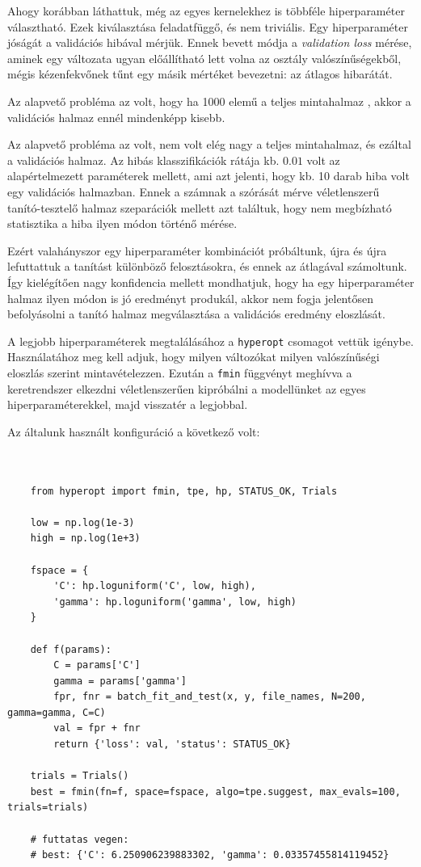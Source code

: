 Ahogy korábban láthattuk, még az egyes kernelekhez is többféle hiperparaméter választható. Ezek kiválasztása
feladatfüggő, és nem triviális. Egy hiperparaméter jóságát a validációs hibával mérjük. Ennek 
bevett módja a \textit{validation loss} mérése, aminek egy változata ugyan előállítható lett volna 
az osztály valószínűségekből, mégis kézenfekvőnek tűnt egy másik mértéket bevezetni: az átlagos hibarátát.

Az alapvető probléma az volt, hogy ha 1000 elemű a teljes mintahalmaz , akkor a validációs 
halmaz ennél mindenképp kisebb. 

Az alapvető probléma az volt, nem volt elég nagy a teljes mintahalmaz, és ezáltal a validációs halmaz.
Az hibás klasszifikációk rátája kb. $ 0.01 $ volt az alapértelmezett paraméterek mellett, ami azt
jelenti, hogy kb. 10 darab hiba volt egy validációs halmazban. Ennek a számnak a szórását mérve véletlenszerű
tanító-tesztelő halmaz szeparációk mellett azt találtuk, hogy nem megbízható statisztika a 
hiba ilyen módon történő mérése.

Ezért valahányszor egy hiperparaméter kombinációt próbáltunk, újra és újra lefuttattuk a
tanítást különböző felosztásokra, és ennek az átlagával számoltunk. Így kielégítően nagy 
konfidencia mellett mondhatjuk, hogy ha egy hiperparaméter halmaz ilyen módon is jó eredményt
produkál, akkor nem fogja jelentősen befolyásolni a tanító halmaz megválasztása a validációs 
eredmény eloszlását.

A legjobb hiperparaméterek megtalálásához a \texttt{hyperopt} \cite{hyperopt} csomagot vettük
igénybe. Használatához meg kell adjuk, hogy milyen változókat milyen valószínűségi eloszlás szerint
mintavételezzen. Ezután a \texttt{fmin} függvényt meghívva a keretrendszer elkezdni véletlenszerűen
kipróbálni a modellünket az egyes hiperparaméterekkel, majd visszatér a legjobbal. 

Az általunk használt konfiguráció a következő volt:
\begin{lstlisting}


	from hyperopt import fmin, tpe, hp, STATUS_OK, Trials
	
	low = np.log(1e-3)
	high = np.log(1e+3)
	
	fspace = {	
		'C': hp.loguniform('C', low, high),
		'gamma': hp.loguniform('gamma', low, high)
	}
	
	def f(params):
		C = params['C']
		gamma = params['gamma']
		fpr, fnr = batch_fit_and_test(x, y, file_names, N=200, gamma=gamma, C=C)
		val = fpr + fnr
		return {'loss': val, 'status': STATUS_OK}
	
	trials = Trials()
	best = fmin(fn=f, space=fspace, algo=tpe.suggest, max_evals=100, trials=trials)
	
	# futtatas vegen:
	# best: {'C': 6.250906239883302, 'gamma': 0.03357455814119452}
\end{lstlisting}



